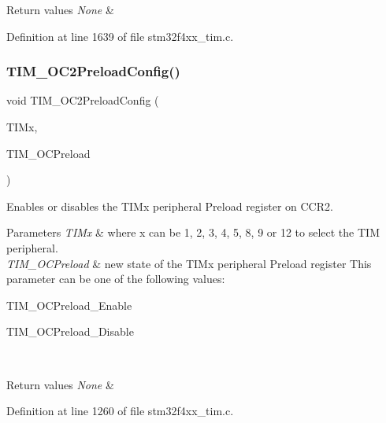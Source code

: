 \begin{DoxyRetVals}{Return values}
{\em None} & \\
\hline
\end{DoxyRetVals}


Definition at line 1639 of file stm32f4xx\+\_\+tim.\+c.

\mbox{\label{group___t_i_m_ga75b4614c6dd2cd52f2c5becdb6590c10}} 
\subsubsection{\texorpdfstring{T\+I\+M\+\_\+\+O\+C2\+Preload\+Config()}{TIM\_OC2PreloadConfig()}}
{\footnotesize\ttfamily void T\+I\+M\+\_\+\+O\+C2\+Preload\+Config (\begin{DoxyParamCaption}\item[{\hyperlink{struct_t_i_m___type_def}{T\+I\+M\+\_\+\+Type\+Def} $\ast$}]{T\+I\+Mx,  }\item[{uint16\+\_\+t}]{T\+I\+M\+\_\+\+O\+C\+Preload }\end{DoxyParamCaption})}



Enables or disables the T\+I\+Mx peripheral Preload register on C\+C\+R2. 


\begin{DoxyParams}{Parameters}
{\em T\+I\+Mx} & where x can be 1, 2, 3, 4, 5, 8, 9 or 12 to select the T\+IM peripheral. \\
\hline
{\em T\+I\+M\+\_\+\+O\+C\+Preload} & new state of the T\+I\+Mx peripheral Preload register This parameter can be one of the following values\+: \begin{DoxyItemize}
\item T\+I\+M\+\_\+\+O\+C\+Preload\+\_\+\+Enable \item T\+I\+M\+\_\+\+O\+C\+Preload\+\_\+\+Disable \end{DoxyItemize}
\\
\hline
\end{DoxyParams}

\begin{DoxyRetVals}{Return values}
{\em None} & \\
\hline
\end{DoxyRetVals}


Definition at line 1260 of file stm32f4xx\+\_\+tim.\+c.

